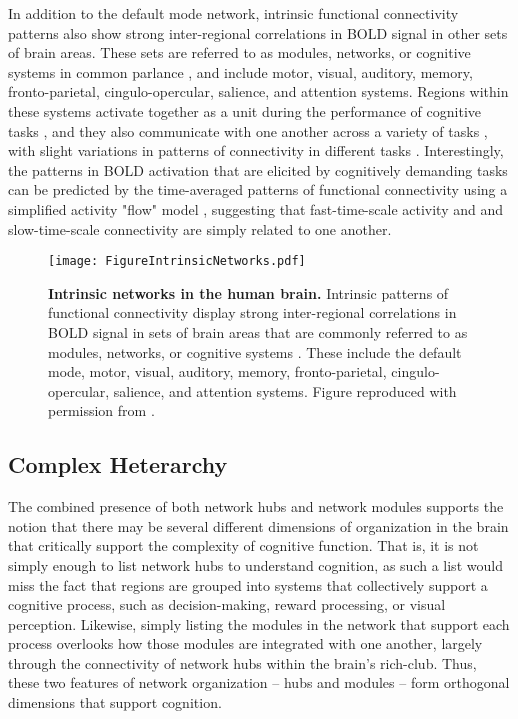 \documentclass[12pt]{article}
\begin{document}
In addition to the default mode network, intrinsic functional connectivity patterns also show strong inter-regional correlations in BOLD signal in other sets of brain areas. These sets are referred to as modules, networks, or cognitive systems in common parlance \cite{power2011functional}, and include motor, visual, auditory, memory, fronto-parietal, cingulo-opercular, salience, and attention systems. Regions within these systems activate together as a unit during the performance of cognitive tasks \cite{tavor2016task}, and they also communicate with one another across a variety of tasks \cite{cole2014intrinsic}, with slight variations in patterns of connectivity in different tasks \cite{cole2013multi}. Interestingly, the patterns in BOLD activation that are elicited by cognitively demanding tasks can be predicted by the time-averaged patterns of functional connectivity using a simplified activity "flow" model \cite{cole2016activity}, suggesting that fast-time-scale activity and and slow-time-scale connectivity are simply related to one another. 


 \begin{figure}[h!]
 	\centerline{\texttt{[image: FigureIntrinsicNetworks.pdf]}}
 	\caption{\textbf{Intrinsic networks in the human brain.} Intrinsic patterns of functional connectivity display strong inter-regional correlations in BOLD signal in sets of brain areas that are commonly referred to as modules, networks, or cognitive systems \cite{power2011functional}. These include the default mode, motor, visual, auditory, memory, fronto-parietal, cingulo-opercular, salience, and attention systems. Figure reproduced with permission from \cite{cole2013multi}.}
 	\label{fig:intrinsicnetworks}
 	\centering
 \end{figure}
 

 
\subsection*{Complex Heterarchy}

The combined presence of both network hubs and network modules supports the notion that there may be several different dimensions of organization in the brain that critically support the complexity of cognitive function. That is, it is not simply enough to list network hubs to understand cognition, as such a list would miss the fact that regions are grouped into systems that collectively support a cognitive process, such as decision-making, reward processing, or visual perception. Likewise, simply listing the modules in the network that support each process overlooks how those modules are integrated with one another, largely through the connectivity of network hubs within the brain's rich-club. Thus, these two features of network organization -- hubs and modules -- form orthogonal dimensions that support cognition.
\end{document}
